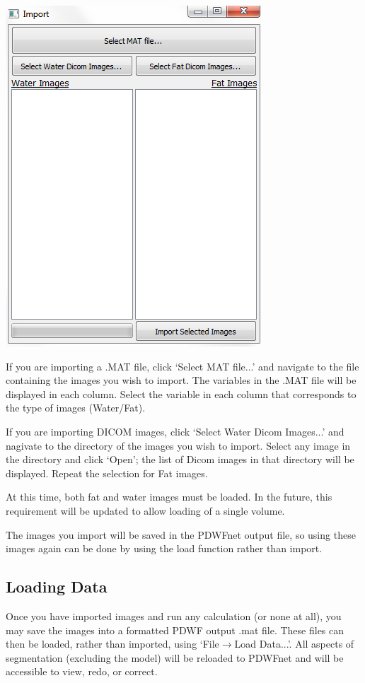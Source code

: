 \documentclass[twoside,a4paper]{refart}
\begin{document}
\includegraphics[width=.7\textwidth]{ImportGUI.png}

If you are importing a .MAT file, click `Select MAT file...' and navigate to the file containing the images you wish to import. The variables in the .MAT file will be displayed in each column. Select the variable in each column that corresponds to the type of images (Water/Fat).

If you are importing DICOM images, click `Select Water Dicom Images...' and nagivate to the directory of the images you wish to import. Select any image in the directory and click `Open'; the list of Dicom images in that directory will be displayed. Repeat the selection for Fat images.

At this time, both fat and water images must be loaded. In the future, this requirement will be updated to allow loading of a single volume.

The images you import will be saved in the PDWFnet output file, so using these images again can be done by using the load function rather than import.


\subsection{Loading Data}

Once you have imported images and run any calculation (or none at all), you may save the images into a formatted PDWF output .mat file. These files can then be loaded, rather than imported, using `File$\rightarrow$Load Data...'. All aspects of segmentation (excluding the model) will be reloaded to PDWFnet and will be accessible to view, redo, or correct.
\end{document}
